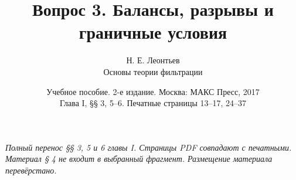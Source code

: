 \documentclass[12pt,a4paper]{article}
\title{Вопрос 3. Балансы, разрывы и граничные условия}
\author{Н. Е. Леонтьев\\\large Основы теории фильтрации}
\date{Учебное пособие. 2-е издание. Москва: МАКС Пресс, 2017\\Глава I, §§ 3, 5--6. Печатные страницы 13--17, 24--37}
\begin{document}
\maketitle
\noindent\textit{Полный перенос §§ 3, 5 и 6 главы I. Страницы PDF совпадают с печатными. Материал § 4 не входит в выбранный фрагмент. Размещение материала перевёрстано.}

\end{document}
